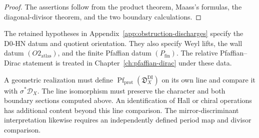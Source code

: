 \begin{proof}
The assertions follow from the product theorem, Maass's formulas,
the diagonal-divisor theorem, and the two boundary calculations.
\end{proof}

The retained hypotheses in
Appendix~\ref{app:obstruction-discharges} specify the D0-HN datum
and quotient orientation.  They also specify Weyl lifts,
the wall datum \((O2_{\mathrm{atlas}})\), and the finite
Pfaffian datum \((P_{\mathrm{fin}})\).
The relative Pfaffian--Dirac statement is treated in
Chapter~\ref{ch:pfaffian-dirac} under these data.

A geometric realization must define
\(\operatorname{Pf}_{\mathrm{prot}}(\mathfrak D_X^{\mathrm{DI}})\)
on its own line and compare it with \(\sigma^*\mathcal D_X\).
The line isomorphism must preserve the character and both boundary
sections computed above.  An identification of Hall or chiral
operations has additional content beyond this line comparison.
The mirror-discriminant interpretation likewise requires an
independently defined period map and divisor comparison.
